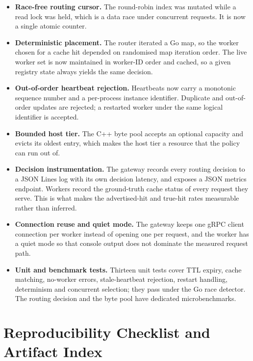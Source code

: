 \documentclass[10pt,twocolumn]{article}
\begin{document}
\begin{itemize}
\item \textbf{Race-free routing cursor.} The round-robin index was mutated
while a read lock was held, which is a data race under concurrent requests. It
is now a single atomic counter.
\item \textbf{Deterministic placement.} The router iterated a Go map, so the
worker chosen for a cache hit depended on randomised map iteration order. The
live worker set is now maintained in worker-ID order and cached, so a given
registry state always yields the same decision.
\item \textbf{Out-of-order heartbeat rejection.} Heartbeats now carry a
monotonic sequence number and a per-process instance identifier. Duplicate and
out-of-order updates are rejected; a restarted worker under the same logical
identifier is accepted.
\item \textbf{Bounded host tier.} The C++ byte pool accepts an optional
capacity and evicts its oldest entry, which makes the host tier a resource
that the policy can run out of.
\item \textbf{Decision instrumentation.} The gateway records every routing
decision to a JSON Lines log with its own decision latency, and exposes a
JSON metrics endpoint. Workers record the ground-truth cache status of every
request they serve. This is what makes the advertised-hit and true-hit rates
measurable rather than inferred.
\item \textbf{Connection reuse and quiet mode.} The gateway keeps one gRPC
client connection per worker instead of opening one per request, and the
worker has a quiet mode so that console output does not dominate the measured
request path.
\item \textbf{Unit and benchmark tests.} Thirteen unit tests cover TTL
expiry, cache matching, no-worker errors, stale-heartbeat rejection, restart
handling, determinism and concurrent selection; they pass under the Go race
detector. The routing decision and the byte pool have dedicated
microbenchmarks.
\end{itemize}

\section{Reproducibility Checklist and Artifact Index}
\label{app:repro}
\end{document}
